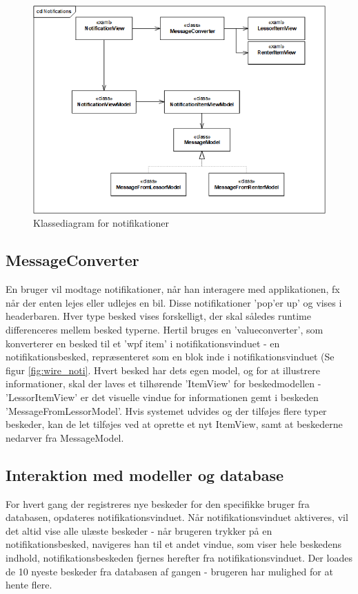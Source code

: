 \documentclass[SoftwareDesign/SoftwareDesign_main.tex]{subfiles}
\begin{document}
\begin{figure}[H]
    \centering
    \includegraphics[width=\textwidth]{SoftwareDesign/MVVMDesigns/Graphics/cd_notification.png}
    \caption{Klassediagram for notifikationer}
    \label{fig:cd_noti}
\end{figure}

\subsection{MessageConverter}
En bruger vil modtage notifikationer, når han interagere med applikationen, fx når der enten lejes eller udlejes en bil. Disse notifikationer 'pop'er up' og vises i headerbaren. Hver type besked vises forskelligt, der skal således runtime differenceres mellem besked typerne. Hertil bruges en 'valueconverter', som konverterer en besked til et 'wpf item' i notifikationsvinduet - en notifikationsbesked, repræsenteret som en blok inde i notifikationsvinduet (Se figur \ref{fig:wire_noti}. Hvert besked har dets egen model, og for at illustrere informationer, skal der laves et tilhørende 'ItemView' for beskedmodellen - 'LessorItemView' er det visuelle vindue for informationen gemt i beskeden 'MessageFromLessorModel'. 
Hvis systemet udvides og der tilføjes flere typer beskeder, kan de let tilføjes ved at oprette et nyt ItemView, samt at beskederne nedarver fra MessageModel. 

\subsection{Interaktion med modeller og database}
For hvert gang der registreres nye beskeder for den specifikke bruger fra databasen, opdateres notifikationsvinduet. Når notifikationsvinduet aktiveres, vil det altid vise alle ulæste beskeder - når brugeren trykker på en notifikationsbesked, navigeres han til et andet vindue, som viser hele beskedens indhold, notifikationsbeskeden fjernes herefter fra notifikationsvinduet. Der loades de 10 nyeste beskeder fra databasen af gangen - brugeren har mulighed for at hente flere. 
\end{document}
